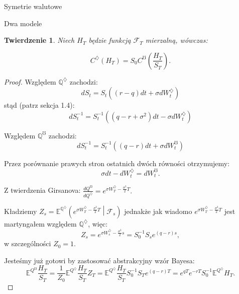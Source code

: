 \documentclass[11pt]{report}
\newtheorem{tw}{Twierdzenie}[chapter]
\begin{document}
\begin{chapter}{Symetrie walutowe}
\begin{section}{Dwa modele}
\begin{tw}Niech $H_T$ będzie funkcją $\mathscr{F}_T$ mierzalną, wówczas:

\begin{equation*}
C^{\diamondsuit}(H_T) = S_0 C^{\mho}\left(\frac{H_T}{S_T} \right).
\end{equation*}
\end{tw}
\begin{proof}
Względem $\mathbb{Q}^{\diamondsuit}$ zachodzi:
\begin{equation*}
dS_t = S_t \left( \left(r-q \right)dt + \sigma dW^{\diamondsuit}_t \right)
\end{equation*}
stąd (patrz sekcja 1.4):
\begin{equation*}
dS^{-1}_t = S^{-1}_t \left( \left(q-r + \sigma^2 \right)dt - \sigma dW^{\diamondsuit}_t \right)
\end{equation*}

Względem $\mathbb{Q}^{\mho}$ zachodzi:
\begin{equation*}
dS^{-1}_t = S^{-1}_t \left( \left(q-r \right)dt + \sigma dW^{\mho}_t \right)
\end{equation*}

Przez porównanie prawych stron ostatnich dwóch równości otrzymujemy:
\begin{equation*}
\sigma dt - dW^{\diamondsuit}_t = dW^{\mho}_t.
\end{equation*}

Z twierdzenia Girsanova:
$ \frac{dQ^{\mho}}{dQ^{\diamondsuit}} = e^{\sigma W^{\diamondsuit}_T-\frac{\sigma^2}{2}T}.$

Kładziemy 
$Z_s = \mathbb{E}^{\mathbb{Q}^{\diamondsuit}} \left( e^{\sigma W^{\diamondsuit}_T-\frac{\sigma^2}{2}T} \middle| \mathscr{F}_s \right) $ jednakże jak wiadomo $e^{\sigma W^{\diamondsuit}_T-\frac{\sigma^2}{2}T}$ jest martyngałem względem $\mathbb{Q}^{\diamondsuit}$, więc: 
\begin{equation*}
Z_s = e^{\sigma W^{\diamondsuit}_s-\frac{\sigma^2}{2}s} = S^{-1}_0 S_s e^{(q-r)s},
\end{equation*}
w szczególności $Z_0=1$.

Jesteśmy już gotowi by zastosować abstrakcyjny wzór Bayesa:
\begin{equation*}
\mathbb{E}^{Q^{\mho}} \frac{H_T}{S_T} = \frac{1}{Z_0}\mathbb{E}^{Q^{\diamondsuit}} \frac{H_T}{S_T} Z_T =  \mathbb{E}^{Q^{\diamondsuit}} \frac{H_T}{S_T} S^{-1}_0 S_T e^{(q-r)T} = e^{qT}e^{-rT}S^{-1}_0 \mathbb{E}^{Q^{\diamondsuit}} H_T.
\end{equation*}





\end{proof}
\end{section}
\end{chapter}
\end{document}
